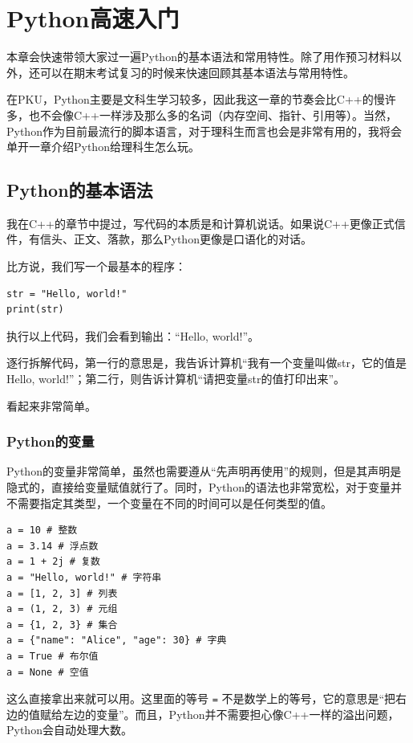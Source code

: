 \chapter{Python高速入门}\label{chap:python-guidance}

本章会快速带领大家过一遍Python的基本语法和常用特性。除了用作预习材料以外，还可以在期末考试复习的时候来快速回顾其基本语法与常用特性。

在PKU，Python主要是文科生学习较多，因此我这一章的节奏会比C++的慢许多，也不会像C++一样涉及那么多的名词（内存空间、指针、引用等）。当然，Python作为目前最流行的脚本语言，对于理科生而言也会是非常有用的，我将会单开一章介绍Python给理科生怎么玩。

\section{Python的基本语法}

我在C++的章节中提过，写代码的本质是和计算机说话。如果说C++更像正式信件，有信头、正文、落款，那么Python更像是口语化的对话。

比方说，我们写一个最基本的程序：

\begin{verbatim}
str = "Hello, world!"
print(str)
\end{verbatim}

执行以上代码，我们会看到输出：“Hello, world!”。

逐行拆解代码，第一行的意思是，我告诉计算机“我有一个变量叫做str，它的值是Hello, world!”；第二行，则告诉计算机“请把变量str的值打印出来”。

看起来非常简单。

\subsection{Python的变量}

Python的变量非常简单，虽然也需要遵从“先声明再使用”的规则，但是其声明是隐式的，直接给变量赋值就行了。同时，Python的语法也非常宽松，对于变量并不需要指定其类型，一个变量在不同的时间可以是任何类型的值。

\begin{verbatim}
a = 10 # 整数
a = 3.14 # 浮点数
a = 1 + 2j # 复数
a = "Hello, world!" # 字符串
a = [1, 2, 3] # 列表
a = (1, 2, 3) # 元组
a = {1, 2, 3} # 集合
a = {"name": "Alice", "age": 30} # 字典
a = True # 布尔值
a = None # 空值
\end{verbatim}
这么直接拿出来就可以用。这里面的等号 \texttt{=} 不是数学上的等号，它的意思是“把右边的值赋给左边的变量”。而且，Python并不需要担心像C++一样的溢出问题，Python会自动处理大数。

